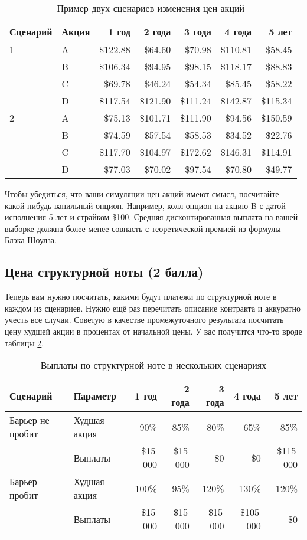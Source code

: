 \documentclass[a4paper,14pt]{extarticle}
\begin{document}
\begin{table}[h]
\centering
\begin{tabular}{l|l|r|r|r|r|r}
Сценарий & Акция & 1 год & 2 года & 3 года & 4 года & 5 лет \\
\hline
1 & A & \$122.88 &  \$64.60 &  \$70.98 & \$110.81 &  \$58.45 \\
  & B & \$106.34 &  \$94.95 &  \$98.15 & \$118.17 &  \$88.83 \\
  & C &  \$69.78 &  \$46.24 &  \$54.34 &  \$85.45 &  \$58.22 \\
  & D & \$117.54 & \$121.90 & \$111.24 & \$142.87 & \$115.34 \\
\hline
2 & A &  \$75.13 & \$101.71 & \$111.90 &  \$94.56 & \$150.59 \\
  & B &  \$74.59 &  \$57.54 &  \$58.53 &  \$34.52 &  \$22.76 \\
  & C & \$117.70 & \$104.97 & \$172.62 & \$146.31 & \$114.91 \\
  & D &  \$77.03 &  \$70.02 &  \$97.54 &  \$70.80 &  \$49.77
\end{tabular}
\caption{Пример двух сценариев изменения цен акций}
\label{table_stock_prices}
\end{table}

Чтобы убедиться, что ваши симуляции цен акций имеют смысл, посчитайте
какой-нибудь ванильный опцион. Например, колл-опцион на акцию B с датой 
исполнения 
5 лет и страйком \$100. Средняя дисконтированная выплата на вашей выборке должна 
более-менее совпасть с теоретической премией из формулы Блэка-Шоулза.

\subsection{Цена структурной ноты (2 балла)}

Теперь вам нужно посчитать, какими будут платежи по структурной ноте в каждом
из сценариев. Нужно ещё раз перечитать описание контракта и аккуратно учесть все 
случаи. Советую в качестве промежуточного результата посчитать цену худшей акции
в процентах от начальной цены. У вас получится что-то вроде таблицы 
\ref{table_note_payments}.

\begin{table}[h]
\centering
\small
\begin{tabular}{l|l|r|r|r|r|r}
Сценарий & Параметр & 1 год  & 2 года & 3 года & 4 года & 5 лет \\
\hline
Барьер не пробит & Худшая акция & 90\% & 85\% &	80\%	& 65\% & 85\% \\
            & Выплаты      & \$15\,000 &       \$15\,000 & \$0 &    \$0 & \$115\,000 \\
\hline
Барьер пробит & Худшая акция & 100\% & 95\% & 120\%	& 130\% & 120\% \\
            & Выплаты      & \$15\,000 &  \$15\,000  &   \$15\,000 &    \$105\,000 & \$0 \\ 

\end{tabular}
\caption{Выплаты по структурной ноте в нескольких сценариях}
\label{table_note_payments}
\end{table}
\end{document}
